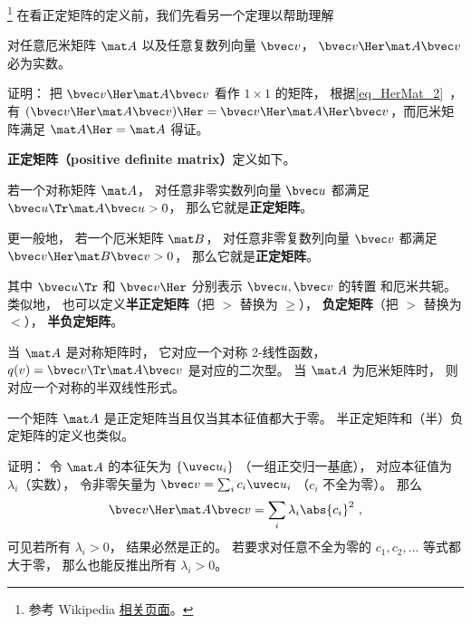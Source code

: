 

\footnote{参考 Wikipedia \href{https://en.wikipedia.org/wiki/Definite_matrix}{相关页面}。}
在看正定矩阵的定义前，我们先看另一个定理以帮助理解

\begin{theorem}{}
对任意厄米矩阵 $\mat A$ 以及任意复数列向量 $\bvec v$， $\bvec v\Her \mat A \bvec v$ 必为实数。
\end{theorem}
证明： 把 $\bvec v\Her \mat A \bvec v$ 看作 $1\times 1$ 的矩阵， 根据\autoref{eq_HerMat_2}~， 有 $(\bvec v\Her \mat A \bvec v)\Her = \bvec v\Her \mat A\Her \bvec v$，而厄米矩阵满足 $\mat A\Her=\mat A$ 得证。

\textbf{正定矩阵（positive definite matrix）}定义如下。
\begin{definition}{}
若一个对称矩阵 $\mat A$， 对任意非零实数列向量 $\bvec u$ 都满足 $\bvec u\Tr \mat A \bvec u > 0$， 那么它就是\textbf{正定矩阵}。

更一般地， 若一个厄米矩阵 $\mat B$， 对任意非零复数列向量 $\bvec v$ 都满足 $\bvec v\Her \mat B \bvec v > 0$， 那么它就是\textbf{正定矩阵}。
\end{definition}
其中 $\bvec u\Tr$ 和 $\bvec v\Her$ 分别表示 $\bvec u, \bvec v$ 的转置 和厄米共轭。 类似地， 也可以定义\textbf{半正定矩阵}（把 $>$ 替换为 $\geqslant$）， \textbf{负定矩阵}（把 $>$ 替换为 $<$）， \textbf{半负定矩阵}。

当 $\mat A$ 是对称矩阵时， 它对应一个对称 2-线性函数， $q(v) = \bvec v\Tr \mat A \bvec v$ 是对应的二次型。 当 $\mat A$ 为厄米矩阵时， 则对应一个对称的半双线性形式。

\begin{theorem}{}
一个矩阵 $\mat A$ 是正定矩阵当且仅当其本征值都大于零。 半正定矩阵和（半）负定矩阵的定义也类似。
\end{theorem}

证明： 令 $\mat A$ 的本征矢为 $\{\uvec u_i\}$ （一组正交归一基底）， 对应本征值为 $\lambda_i$（实数）， 令非零矢量为 $\bvec v = \sum_i c_i \uvec u_i$ （$c_i$ 不全为零）。 那么
\begin{equation}
\bvec v\Her \mat A \bvec v = \sum_i \lambda_i \abs{c_i}^2~,
\end{equation}
可见若所有 $\lambda_i > 0$， 结果必然是正的。 若要求对任意不全为零的 $c_1,c_2,\dots$ 等式都大于零， 那么也能反推出所有 $\lambda_i > 0$。

